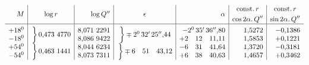 \[
\begin{array}{r|c|r|c|r|r|r}
M&\log r&\log Q''&\epsilon&\alpha&\begin{gathered}\mathrm{const.}\,r\\\cos2\alpha.\,Q''\end{gathered}&\begin{gathered}\mathrm{const.}\,r\\\sin2\alpha.\,Q''\end{gathered}\\\hline
\rule{0pt}{18pt}\begin{array}{@{}r@{}}+18^{0}\\-18^{0}\end{array}&\left.\vphantom{\begin{array}{c}0\\0\end{array}}\right\}0{,}473\ 4770&\begin{array}{@{}r@{}}8{,}071\ 2291\\8{,}086\ 9422\end{array}&\left.\vphantom{\begin{array}{c}0\\0\end{array}}\right\}\mp2^{0}\,32'\,25''{,}44&\begin{array}{@{}r@{}}-2^{0}\,35'\,36''{,}80\\+2\quad12\quad11{,}11\end{array}&\begin{array}{@{}r@{}}1{,}5272\\1{,}5853\end{array}&\begin{array}{@{}r@{}}-0{,}1386\\+0{,}1221\end{array}\\[3pt]
\begin{array}{@{}r@{}}+54^{0}\\-54^{0}\end{array}&\left.\vphantom{\begin{array}{c}0\\0\end{array}}\right\}0{,}463\ 1441&\begin{array}{@{}r@{}}8{,}044\ 6234\\8{,}073\ 7311\end{array}&\left.\vphantom{\begin{array}{c}0\\0\end{array}}\right\}\mp6\quad51\quad43{,}12&\begin{array}{@{}r@{}}-6\quad31\quad41{,}64\\+6\quad38\quad40{,}63\end{array}&\begin{array}{@{}r@{}}1{,}3720\\1{,}4657\end{array}&\begin{array}{@{}r@{}}-0{,}3181\\+0{,}3462\end{array}\\[3pt]

\end{array}\]
